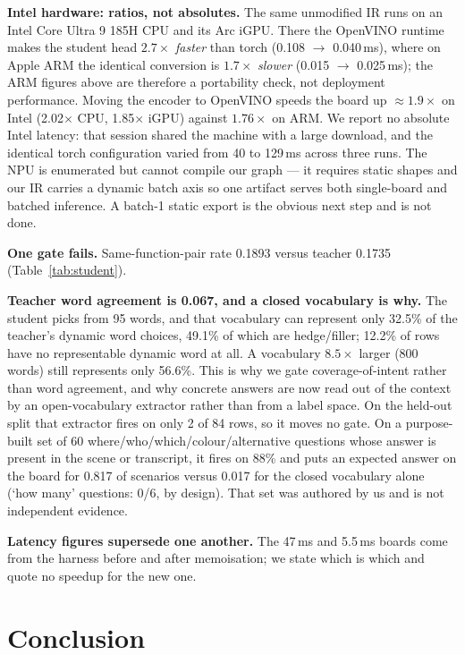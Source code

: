 \documentclass{article}
\begin{document}
\textbf{Intel hardware: ratios, not absolutes.} The same unmodified IR runs on
an Intel Core Ultra 9 185H CPU and its Arc iGPU. There the OpenVINO runtime makes
the student head $2.7\times$ \emph{faster} than torch (0.108 $\to$ 0.040\,ms),
where on Apple ARM the identical conversion is $1.7\times$ \emph{slower}
(0.015 $\to$ 0.025\,ms); the ARM figures above are therefore a portability check,
not deployment performance. Moving the encoder to OpenVINO speeds the board up
$\approx1.9\times$ on Intel (2.02$\times$ CPU, 1.85$\times$ iGPU) against
$1.76\times$ on ARM. We report no absolute Intel latency: that session shared the
machine with a large download, and the identical torch configuration varied from
40 to 129\,ms across three runs. The NPU is enumerated but cannot compile our
graph --- it requires static shapes and our IR carries a dynamic batch axis so one
artifact serves both single-board and batched inference. A batch-1 static export
is the obvious next step and is not done.

\textbf{One gate fails.} Same-function-pair rate 0.1893 versus teacher 0.1735
(Table~\ref{tab:student}).

\textbf{Teacher word agreement is 0.067, and a closed vocabulary is why.} The
student picks from 95 words, and that vocabulary can represent only 32.5\% of
the teacher's dynamic word choices, 49.1\% of which are hedge/filler; 12.2\% of
rows have no representable dynamic word at all. A vocabulary $8.5\times$ larger
(800 words) still represents only 56.6\%. This is why we gate coverage-of-intent
rather than word agreement, and why concrete answers are now read out of the
context by an open-vocabulary extractor rather than from a label space. On the
held-out split that extractor fires on only 2 of 84 rows, so it moves no gate.
On a purpose-built set of 60 where/who/which/colour/alternative questions whose
answer is present in the scene or transcript, it fires on 88\% and puts an
expected answer on the board for 0.817 of scenarios versus 0.017 for the closed
vocabulary alone (`how many' questions: 0/6, by design). That set was authored
by us and is not independent evidence.

\textbf{Latency figures supersede one another.} The 47\,ms and 5.5\,ms boards
come from the harness before and after memoisation; we state which is which and
quote no speedup for the new one.

\section{Conclusion}
\end{document}
